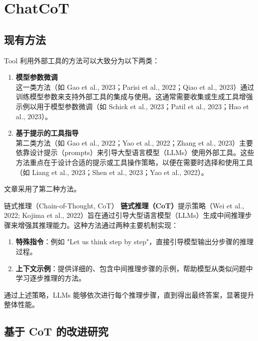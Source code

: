 \section{ChatCoT}
\subsection{现有方法}
\begin{frame}{Tool}
    利用外部工具的方法可以大致分为以下两类：
    \begin{enumerate}
        \item \textbf{模型参数微调} \\
        这一类方法（如 Gao et al., 2023；Parisi et al., 2022；Qiao et al., 2023）通过训练模型参数来支持外部工具的集成与使用。这通常需要收集或生成工具增强示例以用于模型参数微调（如 Schick et al., 2023；Patil et al., 2023；Hao et al., 2023）。
        \pause
        \item \textbf{基于提示的工具指导} \\
        第二类方法（如 Gao et al., 2022；Yao et al., 2022；Zhang et al., 2023）主要依靠设计提示（prompts）来引导大型语言模型（LLMs）使用外部工具。这些方法重点在于设计合适的提示或工具操作策略，以便在需要时选择和使用工具（如 Liang et al., 2023；Shen et al., 2023；Yao et al., 2022）。
    \end{enumerate}
    
    文章采用了第二种方法。
\end{frame}


\begin{frame}{链式推理（Chain-of-Thought, CoT）}
    \textbf{链式推理（CoT）}提示策略（Wei et al., 2022; Kojima et al., 2022）旨在通过引导大型语言模型（LLMs）生成中间推理步骤来增强其推理能力。这种方法通过两种主要机制实现：
    \begin{enumerate}
        \item \textbf{特殊指令}：例如 "Let us think step by step"，直接引导模型输出分步骤的推理过程。
        \item \textbf{上下文示例}：提供详细的、包含中间推理步骤的示例，帮助模型从类似问题中学习逐步推理的方法。
    \end{enumerate}
    
    通过上述策略，LLMs 能够依次进行每个推理步骤，直到得出最终答案，显著提升整体性能。
\end{frame}

\subsection{基于 CoT 的改进研究}

